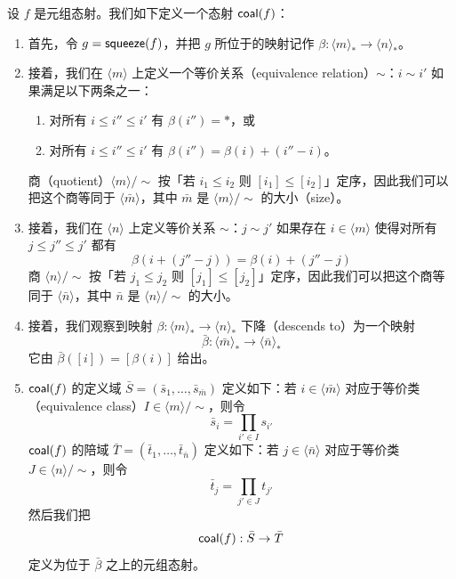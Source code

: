 \begin{construction}\label{constructionofcoalesceofmorphisminC}
    设 $f$ 是元组态射。我们如下定义一个态射 $\mathsf{coal}(f)$：
    \begin{enumerate}
    \item 首先，令 $g = \mathsf{squeeze}(f)$，并把 $g$ 所位于的映射记作 $\beta:\langle m \rangle_* \to \langle n \rangle_*$。
        \item 接着，我们在 $\langle m \rangle$ 上定义一个等价关系（equivalence relation）$\sim$：$i \sim i'$ 如果满足以下两条之一：
        \begin{enumerate}
            \item 对所有 $i \leq i'' \leq i'$ 有 $\beta(i'') = *$，或
            \item 对所有 $i \leq i'' \leq i'$ 有 $\beta(i'') = \beta(i) + (i'' - i)$。
        \end{enumerate}
        商（quotient）$\langle m \rangle / \sim$ 按「若 $i_1 \leq i_2$ 则 $[i_1] \leq [i_2]$」定序，因此我们可以把这个商等同于 $\langle \bar{m} \rangle$，其中 $\bar{m}$ 是 $\langle m \rangle / \sim$ 的大小（size）。
        \item 接着，我们在 $\langle n \rangle$ 上定义等价关系 $\sim$：$j \sim j'$ 如果存在 $i \in \langle m \rangle$ 使得对所有 $j \leq j'' \leq j'$ 都有
        \[\beta(i + (j''-j)) = \beta(i) + (j'' - j)\]
        商 $\langle n \rangle / \sim$ 按「若 $j_1 \leq j_2$ 则 $[j_1] \leq [j_2]$」定序，因此我们可以把这个商等同于 $\langle \bar{n} \rangle$，其中 $\bar{n}$ 是 $\langle n \rangle / \sim$ 的大小。
        \item 接着，我们观察到映射 $\beta:\langle m \rangle_* \to \langle n \rangle_*$ 下降（descends to）为一个映射
        \[
        \bar{\beta}: \langle \bar{m} \rangle_* \to \langle \bar{n} \rangle_*
        \]
        它由 $\bar{\beta}([i]) = [\beta(i)]$ 给出。
        \item $\mathsf{coal}(f)$ 的定义域 $\bar{S} = (\bar{s}_1,\dots,\bar{s}_{\bar{m}})$ 定义如下：若 $i \in \langle \bar{m} \rangle$ 对应于等价类（equivalence class）$I \in \langle m \rangle / \sim$，则令
        \[
        \bar{s}_i = \prod_{i' \in I} s_{i'}
        \]
        $\mathsf{coal}(f)$ 的陪域 $\bar{T} = (\bar{t}_1,\dots,\bar{t}_{\bar{n}})$ 定义如下：若 $j \in \langle \bar{n} \rangle$ 对应于等价类 $J \in \langle n \rangle / \sim$，则令
        \[
        \bar{t}_j = \prod_{j' \in J} t_{j'}
        \]
        然后我们把 \[\mathsf{coal}(f):\bar{S} \to \bar{T}\] 定义为位于 $\bar{\beta}$ 之上的元组态射。
    \end{enumerate}
\end{construction}
\color{black}

